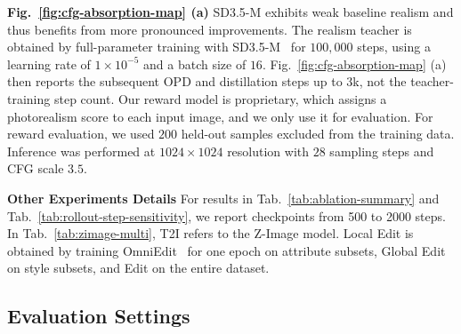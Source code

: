 \documentclass{llmxive}
\begin{document}
\noindent\textbf{Fig.~\ref{fig:cfg-absorption-map} (a)} SD3.5-M exhibits weak baseline realism and thus benefits from more pronounced improvements. The realism teacher is obtained by full-parameter training with SD3.5-M~\cite{esser2024scaling} for $100{,}000$ steps, using a learning rate of $1\times10^{-5}$ and a batch size of $16$. Fig.~\ref{fig:cfg-absorption-map} (a) then reports the subsequent OPD and distillation steps up to $3$k, not the teacher-training step count.
Our reward model is proprietary, which assigns a photorealism score to each input image, and we only use it for evaluation. For reward evaluation, we used $200$ held-out samples excluded from the training data. Inference was performed at $1024\times1024$ resolution with $28$ sampling steps and CFG scale $3.5$.

\noindent\textbf{Other Experiments Details}
For results in Tab.~\ref{tab:ablation-summary} and Tab.~\ref{tab:rollout-step-sensitivity}, we report checkpoints from 500 to 2000 steps. In Tab.~\ref{tab:zimage-multi}, T2I refers to the Z-Image model. Local Edit is obtained by training OmniEdit~\cite{wei2025omniedit} for one epoch on attribute subsets, Global Edit on style subsets, and Edit on the entire dataset.


\vspace{0.2cm}


\subsection{Evaluation Settings}
\label{app:evaluation-settings}


\begin{table}[t]
  \centering
  \scriptsize
  \setlength{\tabcolsep}{3.5pt}
\caption{\textbf{CFG Absorption Diagnostics on GEditBench-EN.} Training-time CFG scale $\alpha$ and inference-time CFG scale $\beta$ compose approximately as $\alpha\beta$, but overly large training-time guidance can still damage the learned field.}
\label{tab:cfg-absorption}
\end{table}
\end{document}
